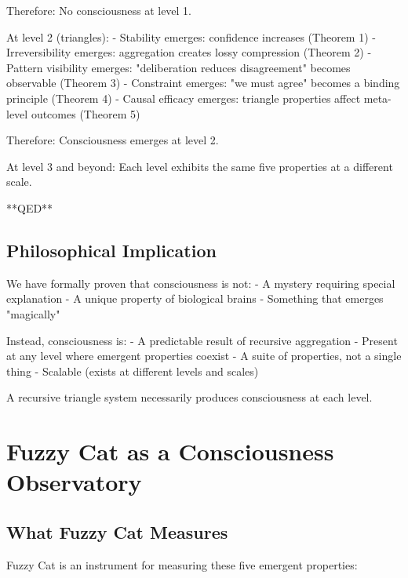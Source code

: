 \documentclass[12pt,a4paper]{article}
\theoremstyle{definition}
\begin{document}
{Therefore: No consciousness at level 1.

At level 2 (triangles):
- Stability emerges: confidence increases (Theorem 1)
- Irreversibility emerges: aggregation creates lossy compression (Theorem 2)
- Pattern visibility emerges: "deliberation reduces disagreement" becomes observable (Theorem 3)
- Constraint emerges: "we must agree" becomes a binding principle (Theorem 4)
- Causal efficacy emerges: triangle properties affect meta-level outcomes (Theorem 5)

Therefore: Consciousness emerges at level 2.

At level 3 and beyond: Each level exhibits the same five properties at a different scale.

**QED**

\subsection{Philosophical Implication}

We have formally proven that consciousness is not:
- A mystery requiring special explanation
- A unique property of biological brains
- Something that emerges "magically"

Instead, consciousness is:
- A predictable result of recursive aggregation
- Present at any level where emergent properties coexist
- A suite of properties, not a single thing
- Scalable (exists at different levels and scales)

A recursive triangle system necessarily produces consciousness at each level.

\section{Fuzzy Cat as a Consciousness Observatory}

\subsection{What Fuzzy Cat Measures}

Fuzzy Cat is an instrument for measuring these five emergent properties:

}
\end{document}
